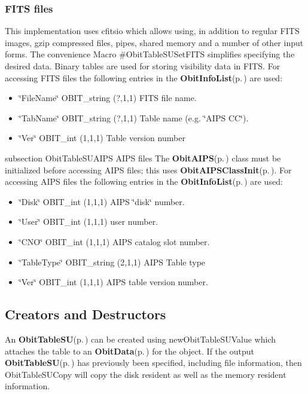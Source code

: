 \subsubsection{FITS files}\label{ObitTableWX_8h_TableFITS}
This implementation uses cfitsio which allows using, in addition to regular FITS images, gzip compressed files, pipes, shared memory and a number of other input forms. The convenience Macro \#Obit\-Table\-SUSet\-FITS simplifies specifying the desired data. Binary tables are used for storing visibility data in FITS. For accessing FITS files the following entries in the {\bf Obit\-Info\-List}{\rm (p.\,\pageref{structObitInfoList})} are used: \begin{itemize}
\item \char`\"{}File\-Name\char`\"{} OBIT\_\-string (?,1,1) FITS file name. \item \char`\"{}Tab\-Name\char`\"{} OBIT\_\-string (?,1,1) Table name (e.g. \char`\"{}AIPS CC\char`\"{}). \item \char`\"{}Ver\char`\"{} OBIT\_\-int (1,1,1) Table version number\end{itemize}
subsection Obit\-Table\-SUAIPS AIPS files The {\bf Obit\-AIPS}{\rm (p.\,\pageref{structObitAIPS})} class must be initialized before accessing AIPS files; this uses {\bf Obit\-AIPSClass\-Init}{\rm (p.\,\pageref{ObitAIPS_8c_a5})}. For accessing AIPS files the following entries in the {\bf Obit\-Info\-List}{\rm (p.\,\pageref{structObitInfoList})} are used: \begin{itemize}
\item \char`\"{}Disk\char`\"{} OBIT\_\-int (1,1,1) AIPS \char`\"{}disk\char`\"{} number. \item \char`\"{}User\char`\"{} OBIT\_\-int (1,1,1) user number. \item \char`\"{}CNO\char`\"{} OBIT\_\-int (1,1,1) AIPS catalog slot number. \item \char`\"{}Table\-Type\char`\"{} OBIT\_\-string (2,1,1) AIPS Table type \item \char`\"{}Ver\char`\"{} OBIT\_\-int (1,1,1) AIPS table version number.\end{itemize}
\subsection{Creators and Destructors}\label{ObitTableSU_8h_ObitTableSUaccess}
An {\bf Obit\-Table\-SU}{\rm (p.\,\pageref{structObitTableSU})} can be created using new\-Obit\-Table\-SUValue which attaches the table to an {\bf Obit\-Data}{\rm (p.\,\pageref{structObitData})} for the object. If the output {\bf Obit\-Table\-SU}{\rm (p.\,\pageref{structObitTableSU})} has previously been specified, including file information, then Obit\-Table\-SUCopy will copy the disk resident as well as the memory resident information.


